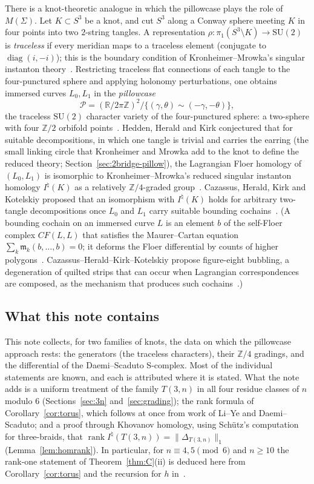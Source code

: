 \documentclass[11pt,reqno]{amsart}
\theoremstyle{plain}
\theoremstyle{definition}
\newcommand{\R}{\mathbb{R}}
\newcommand{\Z}{\mathbb{Z}}
\newcommand{\SU}{\mathrm{SU}(2)}
\newcommand{\Inat}{I^{\natural}}
\newcommand{\pill}{\mathcal{P}}
\begin{document}
There is a knot-theoretic analogue in which the pillowcase plays the role of $M(\Sigma)$. Let
$K\subset S^3$ be a knot, and cut $S^3$ along a Conway sphere meeting $K$ in four points into two
$2$-string tangles. A representation $\rho\colon\pi_1(S^3\setminus K)\to\SU$ is \emph{traceless} if every
meridian maps to a traceless element (conjugate to $\operatorname{diag}(i,-i)$); this is the boundary
condition of Kronheimer--Mrowka's singular instanton theory~\cite{KM1,KM2}. Restricting traceless flat
connections of each tangle to the four-punctured sphere and applying holonomy perturbations, one obtains
immersed curves $L_0,L_1$ in the \emph{pillowcase}
\[
\pill=(\R/2\pi\Z)^2/\{(\gamma,\theta)\sim(-\gamma,-\theta)\},
\]
the traceless $\SU$ character variety of the four-punctured sphere: a two-sphere with four $\Z/2$
orbifold points~\cite{Lin,HHK1}. Hedden, Herald and Kirk conjectured that for suitable decompositions, in
which one tangle is trivial and carries the earring (the small linking circle that Kronheimer and Mrowka
add to the knot to define the reduced theory; Section~\ref{sec:2bridge-pillow}), the Lagrangian
Floer homology of $(L_0,L_1)$ is isomorphic to Kronheimer--Mrowka's reduced singular instanton homology
$\Inat(K)$ as a relatively $\Z/4$-graded group~\cite[Introduction and Conj.~6.5]{HHK2}. Cazassus, Herald,
Kirk and Kotelskiy proposed that an isomorphism with $\Inat(K)$ holds for arbitrary two-tangle
decompositions once $L_0$ and $L_1$ carry suitable bounding cochains~\cite[Conj.~D]{CHKK}. (A bounding
cochain on an immersed curve $L$ is an element $b$ of the self-Floer complex $CF(L,L)$ that satisfies the
Maurer--Cartan equation $\sum_k\mathfrak m_k(b,\dots,b)=0$; it deforms the Floer differential by counts of higher
polygons~\cite{Auroux,CHKK}. Cazassus--Herald--Kirk--Kotelskiy propose figure-eight bubbling, a
degeneration of quilted strips that can occur when Lagrangian correspondences are composed, as the
mechanism that produces such cochains~\cite[\S10.4]{CHKK}.)

\subsection{What this note contains}
This note collects, for two families of knots, the data on which the pillowcase approach rests: the
generators (the traceless characters), their $\Z/4$ gradings, and the differential of the Daemi--Scaduto
S-complex. Most of the individual statements are known, and each is attributed where it is stated. What
the note adds is a uniform treatment of the family $T(3,n)$ in all four residue classes of $n$ modulo $6$
(Sections~\ref{sec:3n} and~\ref{sec:grading}); the rank formula of Corollary~\ref{cor:torus}, which
follows at once from work of Li--Ye and Daemi--Scaduto; and a proof through Khovanov homology, using
Sch\"utz's computation for three-braids, that $\operatorname{rank}\Inat(T(3,n))=\|\Delta_{T(3,n)}\|_1$
(Lemma~\ref{lem:homrank}). In particular, for $n\equiv4,5\pmod6$ and $n\ge10$ the rank-one statement
of Theorem~\ref{thm:C}(ii) is deduced here from Corollary~\ref{cor:torus} and the recursion for $h$
in~\cite[Prop.~6.11]{DScaduto}.
\end{document}
